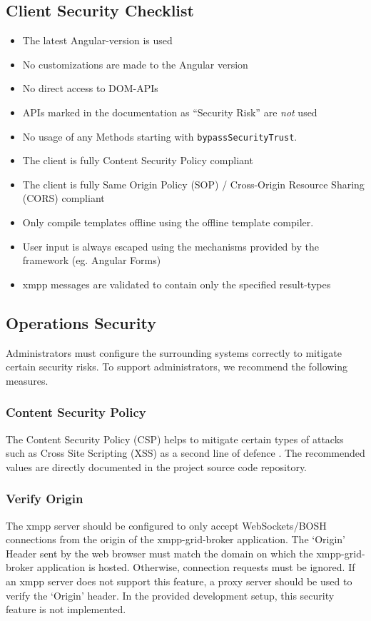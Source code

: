\subsection{Client Security Checklist}
\begin{itemize}
    \item The latest Angular-version is used
    \item No customizations are made to the Angular version
    \item No direct access to DOM-APIs
    \item APIs marked in the documentation as ``Security Risk'' are \emph{not} used
    \item No usage of any Methods starting with \texttt{bypassSecurityTrust}.
    \item The client is fully Content Security Policy compliant
    \item The client is fully Same Origin Policy (SOP) / Cross-Origin Resource Sharing (CORS) compliant
    \item Only compile templates offline using the offline template compiler.
    \item User input is always escaped using the mechanisms provided by the framework (eg. Angular Forms)
    \item \gls{xmpp} messages are validated to contain only the specified result-types
\end{itemize}

\subsection{Operations Security}\label{sec:ops-security}


Administrators must configure the surrounding systems correctly to mitigate certain security risks.
To support administrators, we recommend the following measures.

\subsubsection{Content Security Policy}

The Content Security Policy (CSP) helps to mitigate certain types of attacks such as Cross Site Scripting (XSS) as a second line of defence \cite{w3c-csp}.
The recommended values are directly documented in the project source code repository.

\subsubsection{Verify Origin}
The \gls{xmpp} server should be configured to only accept WebSockets/BOSH connections from the origin of the \gls{xmpp-grid-broker} application.
The `Origin' Header sent by the web browser must match the domain on which the \gls{xmpp-grid-broker} application is hosted.
Otherwise, connection requests must be ignored.
If an \gls{xmpp} server does not support this feature, a proxy server should be used to verify the `Origin' header.
In the provided development setup, this security feature is not implemented.
